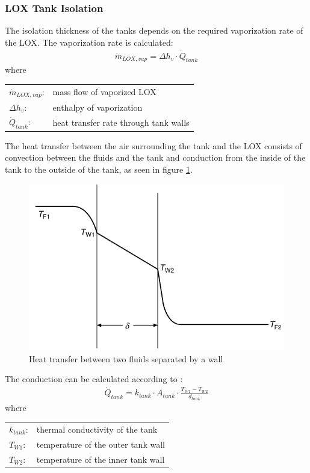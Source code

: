     \subsubsection{LOX Tank Isolation}
The isolation thickness of the tanks depends on the required vaporization rate of the LOX. The vaporization rate is calculated:
\begin{gather} \label{eq:vaporization}
    \dot{m}_{LOX,vap} = \Delta h_v \cdot \dot{Q}_{tank}
\end{gather}
where
\newline
\begin{tabular}{ll}
    $\dot{m}_{LOX,vap}$: & mass flow of vaporized LOX \\
    $\Delta h_v$:        & enthalpy of vaporization \\
    $\dot{Q}_{tank}$:    & heat transfer rate through tank walls \\
\end{tabular}
\newline
The heat transfer between the air surrounding the tank and the LOX consists of convection between the fluids and the tank and conduction from the inside of the tank to the outside of the tank, as seen in figure \ref{fig:heat transfer}. \cite[33-34]{wärmeatlas}
\begin{figure}[h]
    \centering
    \includegraphics[width=0.5\linewidth]{figures/heat transfer.png}
    \caption{Heat transfer between two fluids separated by a wall \cite[33]{wärmeatlas}}
    \label{fig:heat transfer}
\end{figure}
The conduction can be calculated according to \cite[23]{wärmeatlas}:
\begin{gather}
    \dot{Q}_{tank} = k_{tank} \cdot A_{tank} \cdot \frac{T_{W1} - T_{W2}}{d_{tank}}
\end{gather}
where
\newline
\begin{tabular}{ll}
    $k_{tank}$: & thermal conductivity of the tank \\
    $T_{W1}$:   & temperature of the outer tank wall \\
    $T_{W2}$:   & temperature of the inner tank wall \\
\end{tabular}
